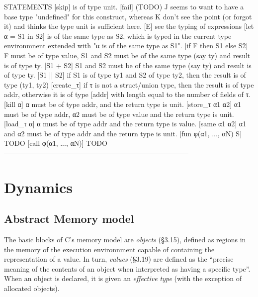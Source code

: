 \documentclass[12pt, a4paper]{article}
\begin{document}
  STATEMENTS
    [skip]                  is of type unit.
    [fail]                  (TODO) J seems to want to have a base type
                            "undefined" for this construct, whereas K don't see
                            the point (or forgot it) and thinks the type unit is
                            sufficient here.
    [E]                     see the typing of expressions
    [let α = S1 in S2]      is of the same type as S2, which is typed in the
                            current type environmnent extended with "α is of the
                            same type as S1".
    [if F then S1 else S2]  F must be of type value, S1 and S2 must be of the
                            same type (say ty) and result is of type ty.
    [S1 + S2]               S1 and S2 must be of the same type (say ty) and
                            result is of type ty.
    [S1 || S2]              if S1 is of type ty1 and S2 of type ty2, then the
                            result is of type (ty1, ty2)
    [create\_τ]              if τ is not a struct/union type, then the result is
                            of type addr, otherwise it is of type [addr] with
                            length equal to the number of fields of τ.
    [kill α]                α must be of type addr, and the return type is unit.
    [store\_τ α1 α2]         α1 must be of type addr, α2 must be of type value
                            and the return type is unit.
    [load\_τ α]              α must be of type addr and the return type is value.
    [same α1 α2]            α1 and α2 must be of type addr and the return type
                            is unit.
    [fun φ(α1, ..., αN) S]  TODO
    [call φ(α1, ..., αN)]   TODO
--------------------------------------------------------------------------------


\section{Dynamics}

\subsection{Abstract Memory model}
The basic blocks of C's memory model are {\it objects} (§3.15), defined
as regions in the memory of the execution environnment capable of
containing the representation of a value. In turn, {\it values}
(§3.19) are defined as the ``precise meaning of the contents of an
object when interpreted as having a specific type''. When an object is
declared, it is given an {\it effective type} (with the exception of
allocated objects).
\end{document}
